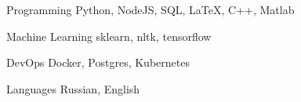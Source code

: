 

\begin{cvskills}

  \cvskill
    {Programming} %
    {Python, NodeJS, SQL, LaTeX, C++, Matlab} %

  \cvskill
    {Machine Learning} %
    {sklearn, nltk, tensorflow} %

  \cvskill
    {DevOps} %
    {Docker, Postgres, Kubernetes} %

  \cvskill
    {Languages} %
    {Russian, English} %

\end{cvskills}
